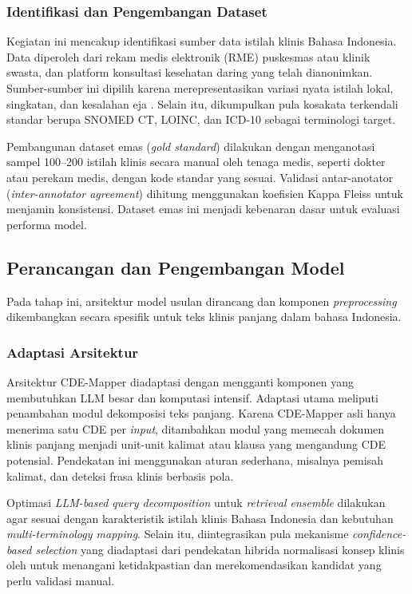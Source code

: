 \subsubsection{Identifikasi dan Pengembangan Dataset}

Kegiatan ini mencakup identifikasi sumber data istilah klinis Bahasa Indonesia. Data diperoleh dari rekam medis elektronik (RME) puskesmas atau klinik swasta, dan platform konsultasi kesehatan daring yang telah dianonimkan. Sumber-sumber ini dipilih karena merepresentasikan variasi nyata istilah lokal, singkatan, dan kesalahan eja \citep{purwitasari_comparison_2023,hossain_exploratory_2025}. Selain itu, dikumpulkan pula kosakata terkendali standar berupa SNOMED CT, LOINC, dan ICD-10 sebagai terminologi target.

Pembangunan dataset emas (\textit{gold standard}) dilakukan dengan menganotasi sampel 100--200 istilah klinis secara manual oleh tenaga medis, seperti dokter atau perekam medis, dengan kode standar yang sesuai. Validasi antar-anotator (\textit{inter-annotator agreement}) dihitung menggunakan koefisien Kappa Fleiss untuk menjamin konsistensi. Dataset emas ini menjadi kebenaran dasar untuk evaluasi performa model.

\subsection{Perancangan dan Pengembangan Model}

Pada tahap ini, arsitektur model usulan dirancang dan komponen \textit{preprocessing} dikembangkan secara spesifik untuk teks klinis panjang dalam bahasa Indonesia.

\subsubsection{Adaptasi Arsitektur}

Arsitektur CDE-Mapper diadaptasi dengan mengganti komponen yang membutuhkan LLM besar dan komputasi intensif. Adaptasi utama meliputi penambahan modul dekomposisi teks panjang. Karena CDE-Mapper asli hanya menerima satu CDE per \textit{input}, ditambahkan modul yang memecah dokumen klinis panjang menjadi unit-unit kalimat atau klausa yang mengandung CDE potensial. Pendekatan ini menggunakan aturan sederhana, misalnya pemisah kalimat, dan deteksi frasa klinis berbasis pola.

Optimasi \textit{LLM-based query decomposition} untuk \textit{retrieval ensemble} dilakukan agar sesuai dengan karakteristik istilah klinis Bahasa Indonesia dan kebutuhan \textit{multi-terminology mapping}. Selain itu, diintegrasikan pula mekanisme \textit{confidence-based selection} yang diadaptasi dari pendekatan hibrida normalisasi konsep klinis oleh \citet{chen_clinical_2020} untuk menangani ketidakpastian dan merekomendasikan kandidat yang perlu validasi manual.

